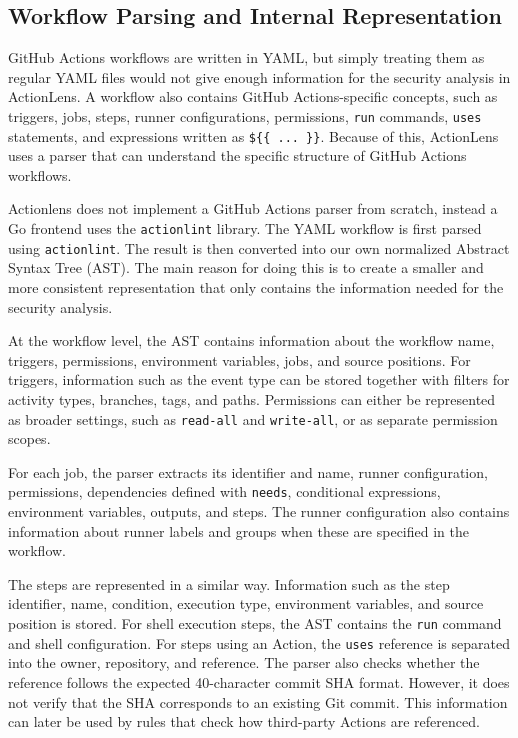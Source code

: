 \documentclass{article}
\begin{document}
\subsection{Workflow Parsing and Internal Representation}

GitHub Actions workflows are written in YAML, but simply treating them as regular YAML files would not give enough information for the security analysis in ActionLens. A workflow also contains GitHub Actions-specific concepts, such as triggers, jobs, steps, runner configurations, permissions, \texttt{run} commands, \texttt{uses} statements, and expressions written as \texttt{\$\{\{ ... \}\}}. Because of this, ActionLens uses a parser that can understand the specific structure of GitHub Actions workflows.

Actionlens does not implement a GitHub Actions parser from scratch, instead a Go frontend uses the \texttt{actionlint} library. The YAML workflow is first parsed using \texttt{actionlint}. The result is then converted into our own normalized Abstract Syntax Tree (AST). The main reason for doing this is to create a smaller and more consistent representation that only contains the information needed for the security analysis.

At the workflow level, the AST contains information about the workflow name, triggers, permissions, environment variables, jobs, and source positions. For triggers, information such as the event type can be stored together with filters for activity types, branches, tags, and paths. Permissions can either be represented as broader settings, such as \texttt{read-all} and \texttt{write-all}, or as separate permission scopes.

For each job, the parser extracts its identifier and name, runner configuration, permissions, dependencies defined with \texttt{needs}, conditional expressions, environment variables, outputs, and steps. The runner configuration also contains information about runner labels and groups when these are specified in the workflow.

The steps are represented in a similar way. Information such as the step identifier, name, condition, execution type, environment variables, and source position is stored. For shell execution steps, the AST contains the \texttt{run} command and shell configuration. For steps using an Action, the \texttt{uses} reference is separated into the owner, repository, and reference. The parser also checks whether the reference follows the expected 40-character commit SHA format. However, it does not verify that the SHA corresponds to an existing Git commit. This information can later be used by rules that check how third-party Actions are referenced.
\end{document}
